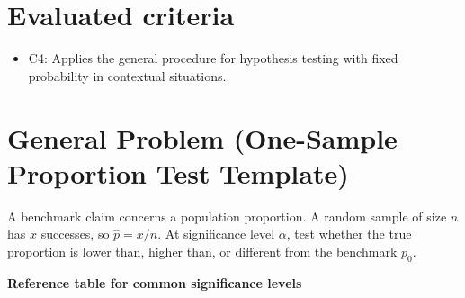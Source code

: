 \newcommand{\TwoTailGraph}[3]{%
\begin{tikzpicture}[x=0.9cm,y=3.0cm]
    \NormalBase
    \fill[blue!20,domain=-3.2:-#1] (-3.2,0) -- plot[samples=90] (\x,{0.4*exp(-\x*\x/2)}) -- (-#1,0) -- cycle;
    \fill[blue!20,domain=#1:3.2] (#1,0) -- plot[samples=90] (\x,{0.4*exp(-\x*\x/2)}) -- (3.2,0) -- cycle;
    \def\ObsColor{black}
    \if\relax\detokenize{#2}\relax\else
        \pgfmathtruncatemacro{\RejectFlag}{#1>=#2}
        \ifnum\RejectFlag=1
            \def\ObsColor{green!60!black}
        \else
            \def\ObsColor{red}
        \fi
        \draw[dashed] (#2,0) -- (#2,{0.4*exp(-#2*#2/2)});
        \draw[dashed] (-#2,0) -- (-#2,{0.4*exp(-#2*#2/2)});
        \node[below] at (#2,-0.05) {\scriptsize $z_{\alpha/2}=#2$};
    \fi
    \draw[\ObsColor,dashed] (-#1,0) -- (-#1,{0.4*exp(-#1*#1/2)});
    \draw[\ObsColor,dashed] (#1,0) -- (#1,{0.4*exp(-#1*#1/2)});
    \node[above,text=\ObsColor] at (#1,{0.4*exp(-#1*#1/2)}) {\scriptsize $|z_{obs}|=#1$};
    \node at (0,0.46) {\scriptsize #3};
\end{tikzpicture}%
}



	\maketitle

	\setcounter{tocdepth}{1}
	\setcounter{secnumdepth}{2}
	\tableofcontents

\section*{Evaluated criteria}
\begin{itemize}
    \item C4: Applies the general procedure for hypothesis testing with fixed probability in contextual situations.
\end{itemize}


\section{General Problem (One-Sample Proportion Test Template)}
A benchmark claim concerns a population proportion. A random sample of size \(n\) has \(x\) successes, so \(\hat p=x/n\). At significance level \(\alpha\), test whether the true proportion is lower than, higher than, or different from the benchmark \(p_0\).

\textbf{Reference table for common significance levels}

